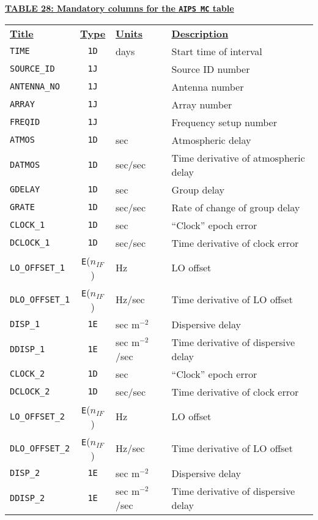 \documentclass[twoside]{article}
\newcommand{\nif}{$n_{IF}$}
\begin{document}
\begin{center}
\underline{\bf{TABLE 28: Mandatory columns for the {\tt AIPS MC} table}}\\
\begin{tabular}{lcll}
\noalign{\vspace{2pt}} \label{ta:MCcols}
\underline{{\bf Title\vphantom{y}}} & \underline{\bf{Type}} &
   \underline{{\bf Units\vphantom{y}}} & \underline{\bf{Description}} \\
\noalign{\vspace{2pt}}
{\tt TIME}        & {\tt 1D} & days  & Start time of interval \\
{\tt SOURCE\_ID}  & {\tt 1J} &       & Source ID number \\
{\tt ANTENNA\_NO} & {\tt 1J} &       & Antenna number \\
{\tt ARRAY}       & {\tt 1J} &       & Array number \\
{\tt FREQID}      & {\tt 1J} &       & Frequency setup number \\
{\tt ATMOS}       & {\tt 1D} & sec   & Atmospheric delay \\
{\tt DATMOS}      & {\tt 1D} & sec/sec & Time derivative of
                                       atmospheric delay \\
{\tt GDELAY}      & {\tt 1D} & sec   & Group delay \\
{\tt GRATE}       & {\tt 1D} & sec/sec & Rate of change of group delay \\
{\tt CLOCK\_1}    & {\tt 1D} & sec   & ``Clock'' epoch error \\
{\tt DCLOCK\_1}   & {\tt 1D} & sec/sec & Time derivative of clock error \\
{\tt LO\_OFFSET\_1} & {\tt E}(\nif)  & Hz & LO offset \\
{\tt DLO\_OFFSET\_1} & {\tt E}(\nif) & Hz/sec & Time derivative of
                                        LO offset \\
{\tt DISP\_1}     & {\tt 1E} & sec m$^{-2}$ & Dispersive delay \\
{\tt DDISP\_1}    & {\tt 1E} & sec m$^{-2}$/sec & Time derivative of dispersive
                                        delay \\
\hline
{\tt CLOCK\_2}    & {\tt 1D} & sec   & ``Clock'' epoch error \\
{\tt DCLOCK\_2}   & {\tt 1D} & sec/sec & Time derivative of clock error \\
{\tt LO\_OFFSET\_2} & {\tt E}(\nif) & Hz & LO offset \\
{\tt DLO\_OFFSET\_2} & {\tt E}(\nif) & Hz/sec & Time derivative of
                                        LO offset \\
{\tt DISP\_2}     & {\tt 1E} & sec m$^{-2}$ & Dispersive delay \\
{\tt DDISP\_2}    & {\tt 1E} & sec m$^{-2}$/sec & Time derivative of dispersive
                                        delay
\end{tabular}
\end{center}
\end{document}
